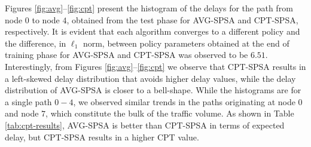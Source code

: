 Figures \ref{fig:avg}--\ref{fig:cpt} present the histogram of the delays for the path from node $0$ to node $4$, obtained from the test phase for AVG-SPSA and CPT-SPSA, respectively.  
It is evident that each algorithm converges to a different policy and the difference, in $\ell_1$ norm, between policy parameters obtained at the end of training phase for AVG-SPSA and CPT-SPSA was observed to be $6.51$. 
Interestingly, from Figures \ref{fig:avg}--\ref{fig:cpt} we observe that CPT-SPSA results in a left-skewed delay distribution that avoids higher delay values, while the delay distribution of AVG-SPSA is closer to a bell-shape. While the histograms are for a single path $0-4$, we observed similar trends in the paths originating at node $0$ and node $7$, which constitute the bulk of the traffic volume. As shown in Table \ref{tab:cpt-results}, AVG-SPSA is better than CPT-SPSA in terms of expected delay, but CPT-SPSA results in a higher CPT value.



